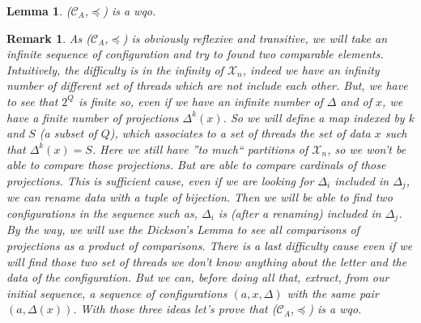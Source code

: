 \documentclass[a4paper,10pt]{report}
\newtheorem{lm}{Lemma}[thr]
\newtheorem{rk}{Remark}
\newcommand{\C}{\mathcal{C}_{A}}
\newcommand{\X}{\mathcal{X}_{n}}
\begin{document}
\begin{lm} \label{cd1}
  ($\C$,$\preceq$) is a wqo.
\end{lm}

\begin{rk}
  As ($\C$,$\preceq$) is obviously reflexive and transitive, we will take an infinite sequence of configuration and try to found two comparable elements.
  Intuitively, the difficulty is in the infinity of $\X$, indeed we have an infinity number of different set of threads which are not include each other.
  But, we have to see that $2^Q$ is finite so, even if we have an infinite number of $\Delta$ and of $x$, we have a finite number of projections $\Delta^k(x)$.
  So we will define a map indexed by $k$ and $S$ (a subset of $Q$), which associates to a set of threads the set of data $x$ such that $\Delta^k(x) = S$.
  Here we still have ''to much``  partitions of $\X$,  so we won't be able to compare those projections.
  But are able to compare cardinals of those projections.
  This is sufficient cause, even if we are looking for $\Delta_i$ included in $\Delta_j$, we can rename data with a tuple of bijection.
  Then we will be able to find two configurations in the sequence such as, $\Delta_i$ is (after a renaming) included in $\Delta_j$.
  By the way, we will use the Dickson's Lemma to see all comparisons of projections as a product of comparisons.
  There is a last difficulty cause even if we will find those two set of threads we don't know anything about the letter and the data of the configuration.
  But we can, before doing all that, extract, from our initial sequence, a sequence of configurations $(a,x,\Delta)$ with the same pair $(a,\Delta(x))$.
  With those three ideas let's prove that ($\C$,$\preceq$) is a wqo.
\end{rk}
\end{document}
